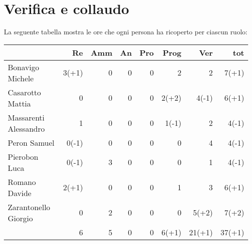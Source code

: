 \section{Verifica e collaudo}


La seguente tabella mostra le ore che ogni persona ha ricoperto per ciascun ruolo:
\begin{table}[ht]
    \begin{tabularx}{\linewidth}{X|rrrrrrr}
    \rowcolor{gray!30}& Re & Amm & An & Pro & Prog & Ver & tot \\
    \hline
    Bonavigo Michele                        & 3(+1)    & 0          & 0       & 0     & 2       & 2       & 7(+1) \\

    \rowcolor{gray!10}Casarotto Mattia      & 0        & 0          & 0       & 0     & 2(+2)   & 4(-1)   & 6(+1) \\

    Massarenti Alessandro                   & 1        & 0          & 0       & 0     & 1(-1)   & 2       & 4(-1) \\ 

    \rowcolor{gray!10}Peron Samuel          & 0(-1)    & 0          & 0       & 0     & 0       & 4       & 4(-1) \\ 

    Pierobon Luca                           & 0(-1)    & 3          & 0       & 0     & 0       & 1       & 4(-1) \\ 

    \rowcolor{gray!10}Romano Davide         & 2(+1)        & 0          & 0       & 0     & 1       & 3       & 6(+1)\\

    Zarantonello Giorgio                    & 0        & 2          & 0       & 0     & 0       & 5(+2)   & 7(+2)\\

    \hline                                  & 6    & 5          & 0       & 0     & 6(+1)   & 21(+1)  & 37(+1)\\  
    \end{tabularx}
\end{table}

